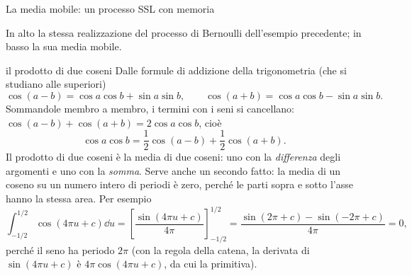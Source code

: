 \begin{esempio}{La media mobile: un processo SSL con memoria}
\begin{center}
\end{center}
In alto la stessa realizzazione del processo di Bernoulli dell'esempio precedente; in basso la sua media mobile.
\end{esempio}

\begin{richiamo}{il prodotto di due coseni}
Dalle formule di addizione della trigonometria (che si studiano alle superiori)
\[ \cos(a - b) = \cos a \cos b + \sin a \sin b , \qquad \cos(a + b) = \cos a \cos b - \sin a \sin b . \]
Sommandole membro a membro, i termini con i seni si cancellano: $\cos(a - b) + \cos(a + b) = 2\cos a \cos b$, cioè
\[ \cos a \cos b = \frac12 \cos(a - b) + \frac12 \cos(a + b) . \]
Il prodotto di due coseni è la media di due coseni: uno con la \emph{differenza} degli argomenti e uno con la
\emph{somma}. Serve anche un secondo fatto: la media di un coseno su un numero intero di periodi è zero, perché le parti
sopra e sotto l'asse hanno la stessa area. Per esempio
\[ \int_{-1/2}^{1/2} \cos(4\pi u + c) \dd u = \left[ \frac{\sin(4\pi u + c)}{4\pi} \right]_{-1/2}^{1/2} =
   \frac{\sin(2\pi + c) - \sin(-2\pi + c)}{4\pi} = 0 , \]
perché il seno ha periodo $2\pi$ (con la regola della catena, la derivata di $\sin(4\pi u + c)$ è $4\pi \cos(4\pi u +
c)$, da cui la primitiva).
\end{richiamo}

